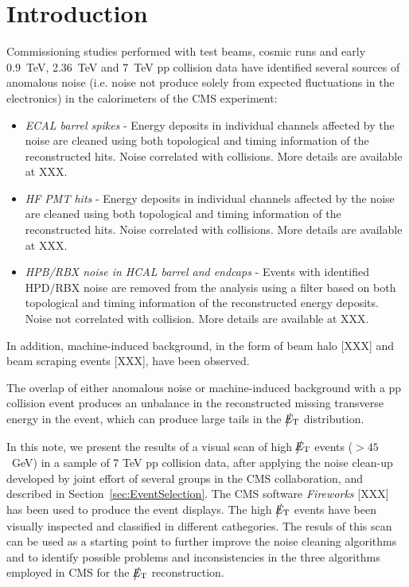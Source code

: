 \section{Introduction}

Commissioning studies performed with test beams, cosmic runs and 
early 0.9~TeV, 2.36~TeV and 7~TeV pp 
collision data have identified several sources of anomalous noise 
(i.e. noise not produce solely from expected fluctuations in the electronics)
in the calorimeters of the CMS experiment:
\begin{itemize}
\item {\it ECAL barrel spikes} - Energy deposits in individual channels 
affected by the noise are cleaned using both topological and 
timing information of the reconstructed hits. Noise correlated with collisions. 
More details are available at XXX.
\item {\it HF PMT hits} - Energy deposits in individual channels 
affected by the noise are cleaned using both topological and 
timing information of the reconstructed hits. Noise correlated with collisions. 
More details are available at XXX.
\item {\it HPB/RBX noise in HCAL barrel and endcaps} - Events with identified 
HPD/RBX noise are removed from the analysis using a filter based on both topological 
and timing information of the reconstructed energy deposits. Noise not correlated 
with collision. More details are available at XXX.
\end{itemize}
In addition, machine-induced background, in the form of 
beam halo [XXX] and beam scraping events [XXX], have been observed. 

The overlap of either anomalous noise or machine-induced background 
with a pp collision event produces an unbalance in 
the reconstructed missing transverse energy in the event, which can produce 
large tails in the $\big\slash\hspace{-1.6ex}{E_\text{T}}$ distribution. 

In this note, we present the results of a visual scan of high $\big\slash\hspace{-1.6ex}{E_\text{T}}$ events 
($>45$~GeV) %
in a sample %
of 7 TeV pp collision data, after applying the 
noise clean-up developed by joint effort of several groups in the CMS collaboration, 
and described in Section~\ref{sec:EventSelection}. 
The CMS software {\it Fireworks} [XXX] has been used to produce the event displays. 
The high $\big\slash\hspace{-1.6ex}{E_\text{T}}$ events have been visually inspected and classified in different 
cathegories. The resuls of this scan can be used as a starting point to further improve 
the noise cleaning algorithms and to identify possible problems and inconsistencies 
in the three algorithms employed in CMS for the $\big\slash\hspace{-1.6ex}{E_\text{T}}$ reconstruction.

